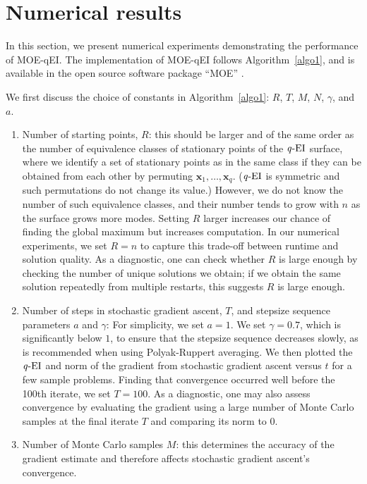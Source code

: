 \documentclass[paper=letter]{scrartcl}
\newcommand{\qEI}{\text{\textit q-EI}}
\begin{document}
\section{Numerical results}
\label{sec:numerical}
In this section, we present numerical experiments demonstrating the performance of MOE-qEI. The implementation of MOE-qEI follows Algorithm~\ref{algo1}, and is available in the open source software package \enquote{MOE}
\citep{moe-github2015}.

We first discuss the choice of constants in Algorithm~\ref{algo1}: $R$, $T$, $M$, $N$, $\gamma$, and $a$.
\begin{enumerate}
\item
Number of starting points, $R$: this should be larger and of the same order as the number of equivalence classes of stationary points of the $\qEI$ surface, where we identify a set of stationary points as in the same class if they can be obtained from each other by permuting $\bm{x}_1,\ldots,\bm{x}_q$.  ($\qEI$ is symmetric and such permutations do not change its value.)
However, we do not know the number of such equivalence classes, and their number tends to grow with $n$ as the surface grows more modes.
Setting $R$ larger increases our chance of finding the global maximum but increases computation. 
In our numerical experiments, we set $R=n$ to capture this trade-off between runtime and solution quality.
As a diagnostic, one can check whether $R$ is large enough by checking the number of unique solutions we obtain; if we obtain the same solution repeatedly from multiple restarts, this suggests $R$ is large enough.
\item
Number of steps in stochastic gradient ascent, $T$, and stepsize sequence parameters $a$ and $\gamma$: For simplicity, we set $a=1$.  We set $\gamma=0.7$, which is significantly below $1$, to ensure that the stepsize sequence decreases slowly, as is recommended when using Polyak-Ruppert averaging.  We then plotted the $\qEI$ and norm of the gradient from stochastic gradient ascent versus $t$ for a few sample problems.  Finding that convergence occurred well before the 100th iterate, we set $T=100$. As a diagnostic, one may also assess convergence by evaluating the gradient using a large number of Monte Carlo samples at the final iterate $T$ and comparing its norm to $0$.
\item
Number of Monte Carlo samples $M$: this determines the accuracy of the gradient estimate and therefore affects stochastic gradient ascent's convergence. 

\end{enumerate}
\end{document}
